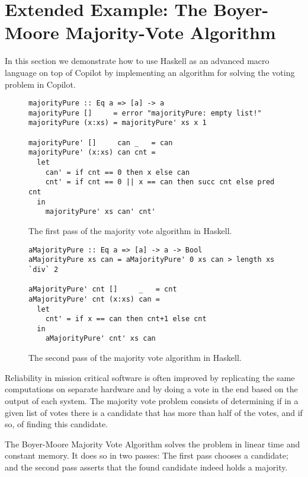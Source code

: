 \section{Extended Example: The Boyer-Moore Majority-Vote Algorithm}
\label{subsec:boyer_moore}

In this section we demonstrate how to use Haskell as an advanced macro language
on top of Copilot by implementing an algorithm for solving the voting problem
in Copilot.

\begin{figure*}[!htb]
\begin{lstlisting}[frame=none]
majorityPure :: Eq a => [a] -> a
majorityPure []     = error "majorityPure: empty list!"
majorityPure (x:xs) = majorityPure' xs x 1

majorityPure' []     can _   = can
majorityPure' (x:xs) can cnt =
  let
    can' = if cnt == 0 then x else can
    cnt' = if cnt == 0 || x == can then succ cnt else pred cnt
  in
    majorityPure' xs can' cnt'
\end{lstlisting}
\caption{The first pass of the majority vote algorithm in Haskell.}
\label{fig:majority_pure}
\end{figure*}

\begin{figure*}[!htb]
\begin{lstlisting}[frame=none]
aMajorityPure :: Eq a => [a] -> a -> Bool
aMajorityPure xs can = aMajorityPure' 0 xs can > length xs `div` 2

aMajorityPure' cnt []     _   = cnt
aMajorityPure' cnt (x:xs) can =
  let
    cnt' = if x == can then cnt+1 else cnt
  in
    aMajorityPure' cnt' xs can
\end{lstlisting}
\caption{The second pass of the majority vote algorithm in Haskell.}
\label{fig:amajority_pure}
\end{figure*}

Reliability in mission critical software is often improved by replicating
the same computations on separate hardware and by doing a vote in the end
based on the output of each system. The majority vote problem consists of
determining if in a given list of votes there is a candidate that has more
than half of the votes, and if so, of finding this candidate.

The Boyer-Moore Majority Vote Algorithm \cite{MooreBoyer82,Hesselink2005} solves
the problem in linear time and constant memory. It does so in two passes: The
first pass chooses a candidate; and the second pass asserts that the
found candidate indeed holds a majority.

